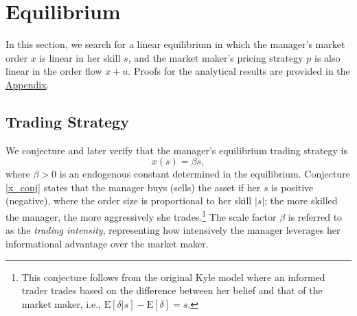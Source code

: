 \section{Equilibrium} \label{sec:eqm}
In this section, we search for a linear equilibrium in which the manager's market order $x$ is linear in her skill $s$, and the market maker's pricing strategy $p$ is also linear in the order flow $x+u$. Proofs for the analytical results are provided in the \hyperref[app:appendix]{Appendix}.

\subsection{Trading Strategy} \label{ss:conjecture}
We conjecture and later verify that the manager's equilibrium trading strategy is
\begin{equation}
 x(s)=\beta s,\label{x_conj}
\end{equation}
where $\beta>0$ is an endogenous constant determined in the equilibrium. Conjecture \eqref{x_conj} states that the manager buys (sells) the asset if her $s$ is positive (negative), where the order size is proportional to her skill $|s|$; the more skilled the manager, the more aggressively she trades.\footnote{This conjecture follows from the original Kyle model where an informed trader trades based on the difference between her belief and that of the market maker, i.e., $ \mathrm{E}[\delta|s]-\mathrm{E}[\delta] = s$.} The scale factor $\beta$ is referred to as the {\it trading intensity}, representing how intensively the manager leverages her informational advantage over the market maker.

